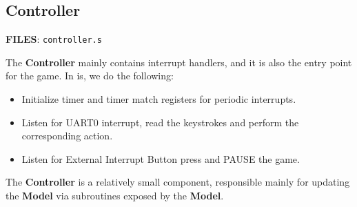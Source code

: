 \subsection{Controller}

  \quad\textbf{FILES}: \texttt{controller.s}

  The \textbf{Controller} mainly contains interrupt handlers, and it is also the entry point for the game.
  In is, we do the following:

  \begin{itemize}
    \item Initialize timer and timer match registers for periodic interrupts.
    \item Listen for UART0 interrupt, read the keystrokes and perform the corresponding action.
    \item Listen for External Interrupt Button press and PAUSE the game.
  \end{itemize}

  The \textbf{Controller} is a relatively small component, responsible mainly for updating the \textbf{Model} via subroutines exposed by the \textbf{Model}.


